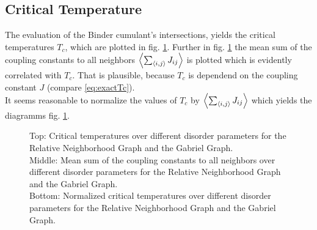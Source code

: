 \subsection{Critical Temperature}
    The evaluation of the Binder cumulant's intersections, yields the
    critical temperatures \(T_c\), which are plotted in
    fig. \ref{fig:Tc}.
    Further in fig. \ref{fig:Tc}
    the mean sum of the coupling constants to all neighbors \(\left< \sum_{\left< i,j \right>} J_{ij} \right>\)
    is plotted which is evidently correlated with \(T_c\).
    That is plausible, because \(T_c\) is dependend on the coupling
    constant \(J\) (compare \eqref{eq:exactTc}).\\
    It seems reasonable to normalize the values of \(T_{c}\) by
    \(\left< \sum_{\left< i,j \right>} J_{ij} \right>\) which yields the diagramms fig.
    \ref{fig:Tc}.
    \begin{figure}[htbp]
        \centering


        \caption[Critical Temperature over different disorder parameters]
        {
            Top: Critical temperatures over different
            disorder parameters for
             the Relative Neighborhood Graph and
             the Gabriel Graph.\\
            Middle: Mean sum of the coupling constants to all
            neighbors over different disorder parameters for
             the Relative Neighborhood Graph and
             the Gabriel Graph.\\
            Bottom: Normalized critical temperatures over different
            disorder parameters for
             the Relative Neighborhood Graph and
             the Gabriel Graph.
        }
        \label{fig:Tc}
    \end{figure}\\

